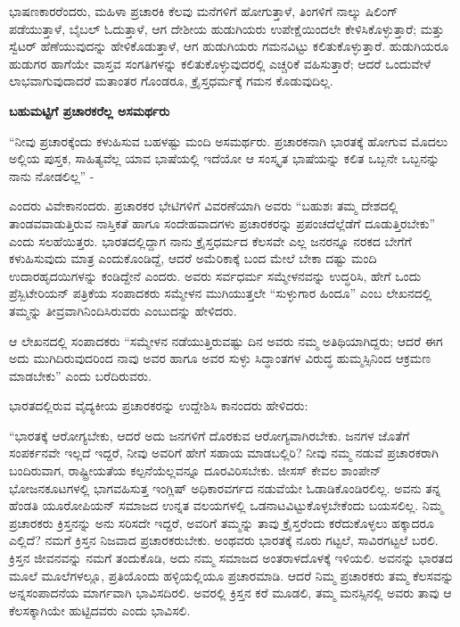 ಭಾಷಣಕಾರರೆಂದರು, ಮಹಿಳಾ ಪ್ರಚಾರಕಿ ಕೆಲವು ಮನೆಗಳಿಗೆ ಹೋಗುತ್ತಾಳೆ, ತಿಂಗಳಿಗೆ ನಾಲ್ಕು ಷಿಲಿಂಗ್ ಪಡೆಯುತ್ತಾಳೆ, ಬೈಬಲ್ ಓದುತ್ತಾಳೆ, ಆಗ ದೇಶೀಯ ಹುಡುಗಿಯರು ಉಪೇಕ್ಷೆಯಿಂದಲೇ ಕೇಳಿಸಿಕೊಳ್ಳುತ್ತಾರೆ; ಮತ್ತು ಸ್ವೆಟರ್ ಹೆಣೆಯುವುದನ್ನು ಹೇಳಿಕೊಡುತ್ತಾಳೆ, ಆಗ ಹುಡುಗಿಯರು ಗಮನವಿಟ್ಟು ಕಲಿತುಕೊಳ್ಳುತ್ತಾರೆ. ಹುಡುಗಿಯರೂ ಹುಡುಗರ ಹಾಗೆಯೇ ವಾಸ್ತವ ಸಂಗತಿಗಳನ್ನು ಕಲಿತುಕೊಳ್ಳುವುದರಲ್ಲಿ ಎಚ್ಚರಿಕೆ ವಹಿಸುತ್ತಾರೆ; ಆದರೆ ಒಂದುವೇಳೆ ಲಾಭವಾಗುವುದಾದರೆ ಮತಾಂತರ ಗೊಂಡರೂ, ಕ್ರೈಸ್ತಧರ್ಮಕ್ಕೆ ಗಮನ ಕೊಡುವುದಿಲ್ಲ.

\begin{center}
\textbf{ಬಹುಮಟ್ಟಿಗೆ ಪ್ರಚಾರಕರೆಲ್ಲ ಅಸಮರ್ಥರು}
\end{center}

“ನೀವು ಪ್ರಚಾರಕ್ಕೆಂದು ಕಳುಹಿಸುವ ಬಹಳಷ್ಟು ಮಂದಿ ಅಸಮರ್ಥರು. ಪ್ರಚಾರಕನಾಗಿ ಭಾರತಕ್ಕೆ ಹೋಗುವ ಮೊದಲು ಅಲ್ಲಿಯ ಪುಸ್ತಕ, ಸಾಹಿತ್ಯವೆಲ್ಲ ಯಾವ ಭಾಷೆಯಲ್ಲಿ ಇದೆಯೋ ಆ ಸಂಸ್ಕೃತ ಭಾಷೆಯನ್ನು ಕಲಿತ ಒಬ್ಬನೇ ಒಬ್ಬನನ್ನು ನಾನು ನೋಡಲಿಲ್ಲ” -

ಎಂದರು ವಿವೇಕಾನಂದರು. ಪ್ರಚಾರಕರ ಭೇಟಿಗಳಿಗೆ ವಿವರಣೆಯಾಗಿ ಅವರು “ಬಹುಶಃ ತಮ್ಮ ದೇಶದಲ್ಲಿ ತಾಂಡವವಾಡುತ್ತಿರುವ ನಾಸ್ತಿಕತೆ ಹಾಗೂ ಸಂದೇಹವಾದಗಳು ಪ್ರಚಾರಕರನ್ನು ಪ್ರಪಂಚದೆಲ್ಲೆಡೆಗೆ ದೂಡುತ್ತಿರಬೇಕು” ಎಂದು ಸಲಹೆಯಿತ್ತರು. ಭಾರತದಲ್ಲಿದ್ದಾಗ ನಾನು ಕ್ರೈಸ್ತಧರ್ಮದ ಕೆಲಸವೇ ಎಲ್ಲ ಜನರನ್ನೂ ನರಕದ ಬೇಗೆಗೆ ಕಳುಹಿಸುವುದು ಮಾತ್ರ ಎಂದುಕೊಂಡಿದ್ದೆ, ಆದರೆ ಅಮೆರಿಕಾಕ್ಕೆ ಬಂದ ಮೇಲೆ ಬೇಕಾ ದಷ್ಟು ಮಂದಿ ಉದಾರಹೃದಯಿಗಳನ್ನು ಕಂಡಿದ್ದೇನೆ ಎಂದರು. ಅವರು ಸರ್ವಧರ್ಮ ಸಮ್ಮೇಳನವನ್ನು ಉದ್ಧರಿಸಿ, ಹೇಗೆ ಒಂದು ಪ್ರೆಸ್ಬಿಟೇರಿಯನ್ ಪತ್ರಿಕೆಯ ಸಂಪಾದಕರು ಸಮ್ಮೇಳನ ಮುಗಿಯುತ್ತಲೇ “ಸುಳ್ಳುಗಾರ ಹಿಂದೂ” ಎಂಬ ಲೇಖನದಲ್ಲಿ ತಮ್ಮನ್ನು ತೀವ್ರವಾಗಿನಿಂದಿಸಿರುವರು ಎಂಬುದನ್ನು ಹೇಳಿದರು.

ಆ ಲೇಖನದಲ್ಲಿ ಸಂಪಾದಕರು “ಸಮ್ಮೇಳನ ನಡೆಯುತ್ತಿರುವಷ್ಟು ದಿನ ಅವರು ನಮ್ಮ ಅತಿಥಿಯಾಗಿದ್ದರು; ಆದರೆ ಈಗ ಅದು ಮುಗಿದಿರುವುದರಿಂದ ನಾವು ಅವರ ಹಾಗೂ ಅವರ ಸುಳ್ಳು ಸಿದ್ಧಾಂತಗಳ ವಿರುದ್ಧ ಹುಮ್ಮಸ್ಸಿನಿಂದ ಆಕ್ರಮಣ ಮಾಡಬೇಕು” ಎಂದು ಬರೆದಿರುವರು.

ಭಾರತದಲ್ಲಿರುವ ವೈದ್ಯಕೀಯ ಪ್ರಚಾರಕರನ್ನು ಉದ್ದೇಶಿಸಿ ಕಾನಂದರು ಹೇಳಿದರು:

“ಭಾರತಕ್ಕೆ ಆರೋಗ್ಯಬೇಕು, ಆದರೆ ಅದು ಜನಗಳಿಗೆ ದೊರಕುವ ಆರೋಗ್ಯವಾಗಿರಬೇಕು. ಜನಗಳ ಜೊತೆಗೆ ಸಂಪರ್ಕನವೇ ಇಲ್ಲದೆ ಇದ್ದರೆ, ನೀವು ಅವರಿಗೆ ಹೇಗೆ ಸಹಾಯ ಮಾಡಬಲ್ಲಿರಿ? ನೀವು ನಮ್ಮ ನಡುವೆ ಪ್ರಚಾರಕರಾಗಿ ಬಂದಿರುವಾಗ, ರಾಷ್ಟ್ರೀಯತೆಯ ಕಲ್ಪನೆಯೆಲ್ಲವನ್ನೂ ದೂರವಿರಿಸಬೇಕು. ಜೀಸಸ್ ಕೇವಲ ಶಾಂಪೇನ್ ಭೋಜನಕೂಟಗಳಲ್ಲಿ ಭಾಗವಹಿಸುತ್ತ ಇಂಗ್ಲಿಷ್ ಅಧಿಕಾರವರ್ಗದ ನಡುವೆಯೇ ಓಡಾಡಿಕೊಂಡಿರಲಿಲ್ಲ. ಅವನು ತನ್ನ ಹೆಂಡತಿ ಯೂರೋಪಿಯನ್ ಸಮಾಜದ ಉನ್ನತ ವಲಯಗಳಲ್ಲಿ ಒಡನಾಟವಿಟ್ಟುಕೊಳ್ಳಬೇಕೆಂದು ಬಯಸಲಿಲ್ಲ. ನಿಮ್ಮ ಪ್ರಚಾರಕರು ಕ್ರಿಸ್ತನನ್ನು ಅನು ಸರಿಸದೇ ಇದ್ದರೆ, ಅವರಿಗೆ ತಮ್ಮನ್ನು ತಾವು ಕ್ರೈಸ್ತರೆಂದು ಕರೆದುಕೊಳ್ಳಲು ಹಕ್ಕಾದರೂ ಎಲ್ಲಿದೆ? ನಮಗೆ ಕ್ರಿಸ್ತನ ನಿಜವಾದ ಪ್ರಚಾರಕರುಬೇಕು. ಅಂಥವರು ಭಾರತಕ್ಕೆ ನೂರು ಗಟ್ಟಲೆ, ಸಾವಿರಗಟ್ಟಲೆ ಬರಲಿ. ಕ್ರಿಸ್ತನ ಜೀವನವನ್ನು ನಮಗೆ ತಂದುಕೊಡಿ, ಅದು ನಮ್ಮ ಸಮಾಜದ ಅಂತರಾಳದೊಳಕ್ಕೆ ಇಳಿಯಲಿ. ಅವನನ್ನು ಭಾರತದ ಮೂಲೆ ಮೂಲೆಗಳಲ್ಲೂ, ಪ್ರತಿಯೊಂದು ಹಳ್ಳಿಯಲ್ಲಿಯೂ ಪ್ರಚಾರಮಾಡಿ. ಆದರೆ ನಿಮ್ಮ ಪ್ರಚಾರಕರು ತಮ್ಮ ಕೆಲಸವನ್ನು ಅನ್ನಸಂಪಾದನೆಯ ಮಾರ್ಗವಾಗಿ ಭಾವಿಸದಿರಲಿ. ಅವರಲ್ಲಿ ಕ್ರಿಸ್ತನ ಕರೆ ಮೂಡಲಿ, ತಮ್ಮ ಮನಸ್ಸಿನಲ್ಲಿ ಅವರು ತಾವು ಆ ಕೆಲಸಕ್ಕಾಗಿಯೇ ಹುಟ್ಟಿದವರು ಎಂದು ಭಾವಿಸಲಿ.

